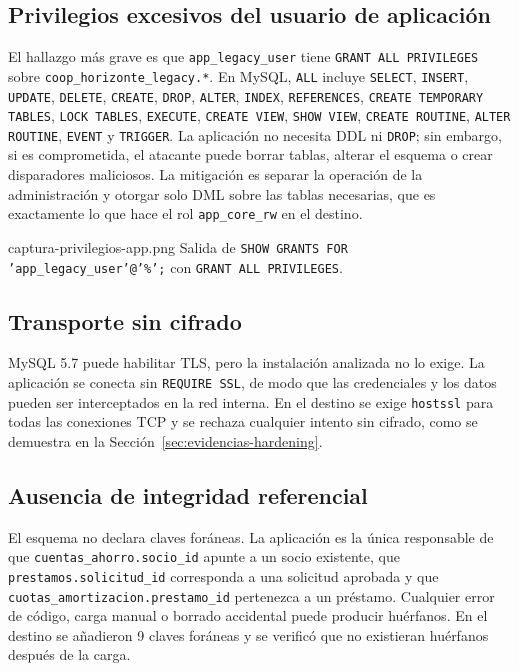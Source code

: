 \subsection{Privilegios excesivos del usuario de aplicación}

El hallazgo más grave es que \texttt{app\_legacy\_user} tiene
\texttt{GRANT ALL PRIVILEGES} sobre \texttt{coop\_horizonte\_legacy.*}. En
MySQL, \texttt{ALL} incluye \texttt{SELECT}, \texttt{INSERT}, \texttt{UPDATE},
\texttt{DELETE}, \texttt{CREATE}, \texttt{DROP}, \texttt{ALTER},
\texttt{INDEX}, \texttt{REFERENCES}, \texttt{CREATE TEMPORARY TABLES},
\texttt{LOCK TABLES}, \texttt{EXECUTE}, \texttt{CREATE VIEW},
\texttt{SHOW VIEW}, \texttt{CREATE ROUTINE}, \texttt{ALTER ROUTINE},
\texttt{EVENT} y \texttt{TRIGGER}. La aplicación no necesita DDL ni
\texttt{DROP}; sin embargo, si es comprometida, el atacante puede borrar
tablas, alterar el esquema o crear disparadores maliciosos. La mitigación es
separar la operación de la administración y otorgar solo DML sobre las tablas
necesarias, que es exactamente lo que hace el rol \texttt{app\_core\_rw} en
el destino.

%
  {captura-privilegios-app.png}%
  {Salida de \texttt{SHOW GRANTS FOR 'app\_legacy\_user'@'\%';} con \texttt{GRANT ALL PRIVILEGES}.}

\subsection{Transporte sin cifrado}

MySQL 5.7 puede habilitar TLS, pero la instalación analizada no lo exige. La
aplicación se conecta sin \texttt{REQUIRE SSL}, de modo que las credenciales
y los datos pueden ser interceptados en la red interna. En el destino se
exige \texttt{hostssl} para todas las conexiones TCP y se rechaza cualquier
intento sin cifrado, como se demuestra en la
Sección~\ref{sec:evidencias-hardening}.

\subsection{Ausencia de integridad referencial}

El esquema no declara claves foráneas. La aplicación es la única responsable
de que \texttt{cuentas\_ahorro.socio\_id} apunte a un socio existente, que
\texttt{prestamos.solicitud\_id} corresponda a una solicitud aprobada y que
\texttt{cuotas\_amortizacion.prestamo\_id} pertenezca a un préstamo. Cualquier
error de código, carga manual o borrado accidental puede producir huérfanos.
En el destino se añadieron 9 claves foráneas y se verificó que no existieran
huérfanos después de la carga.

